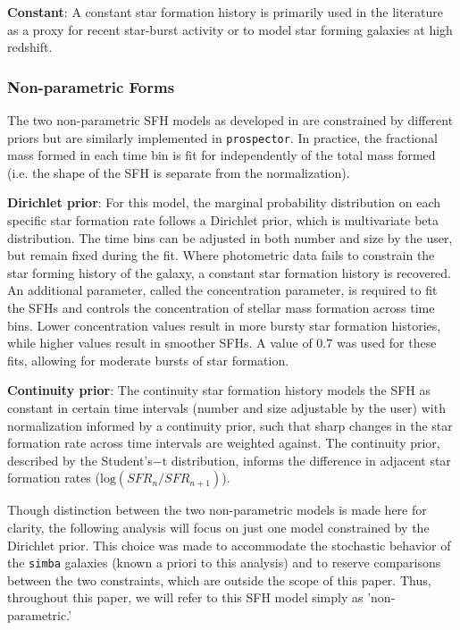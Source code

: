 \documentclass[twocolumn]{aastex62}
\begin{document}
\textbf{Constant}: A constant star formation history is primarily used in the literature as a proxy for recent star-burst activity or to model star forming galaxies at high redshift. 


\subsubsection{Non-parametric Forms}
\label{section:dirichlet}

The two non-parametric SFH models as developed in \cite{leja_deriving_2017} are constrained by different priors but are similarly implemented in \texttt{prospector}. In practice, the fractional mass formed in each time bin is fit for independently of the total mass formed (i.e. the shape of the SFH is separate from the normalization). 

\textbf{Dirichlet prior}: For this model, the marginal probability distribution on each specific star formation rate follows a Dirichlet prior, which is multivariate beta distribution. The time bins can be adjusted in both number and size by the user, but remain fixed during the fit. Where photometric data fails to constrain the star forming history of the galaxy, a constant star formation history is recovered. An additional parameter, called the concentration parameter, is required to fit the SFHs and controls the concentration of stellar mass formation across time bins. Lower concentration values result in more bursty star formation histories, while higher values result in smoother SFHs. A value of $0.7$ was used for these fits, allowing for moderate bursts of star formation. 

\textbf{Continuity prior}: The continuity star formation history models the SFH as constant in certain time intervals (number and size adjustable by the user) with normalization informed by a continuity prior, such that sharp changes in the star formation rate across time intervals are weighted against. The continuity prior, described by the Student's$-$t distribution, informs the difference in adjacent star formation rates ($\mathrm{log}(SFR_n / SFR_{n+1})$). 

Though distinction between the two non-parametric models is made here for clarity, the following analysis will focus on just one model constrained by the Dirichlet prior. This choice was made to accommodate the stochastic behavior of the \texttt{simba} galaxies (known a priori to this analysis) and to reserve comparisons between the two constraints, which are outside the scope of this paper. Thus, throughout this paper, we will refer to this SFH model simply as 'non-parametric.' 
\end{document}
